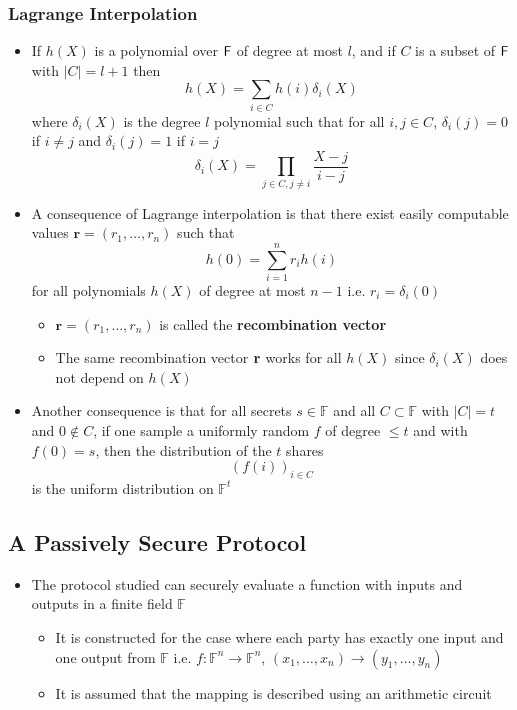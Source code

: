 \subsubsection{Lagrange Interpolation}
\begin{itemize}
  \item If $h(X)$ is a polynomial over $\mathsf{F}$ of degree at most $l$, and if $C$ is a subset of $\mathsf{F}$ with $|C| = l+1$ then
  \[
    h(X) = \sum_{i \in C} h(i) \delta_i(X)
  \]
  where $\delta_i(X)$ is the degree $l$ polynomial such that for all $i,j \in C$, $\delta_i(j) = 0$ if $i \neq j$ and $\delta_i(j) = 1$ if $i=j$
  \[
    \delta_i(X) = \prod_{j \in C, j \neq i} \frac{X-j}{i-j}
  \]	
	
  \item A consequence of Lagrange interpolation is that there exist easily computable values $\mathbf r = (r_1, \dots, r_n)$ such that 
  \[
    h(0) = \sum_{i=1}^n r_i h(i)
  \]
  for all polynomials $h(X)$ of degree at most $n-1$ i.e. $r_i = \delta_i(0)$
  \begin{itemize}
  	\item $\mathbf r = (r_1, \dots, r_n)$ is called the \textbf{recombination vector} 
  	\item The same recombination vector $\bf r$ works for all $h(X)$ since $\delta_i(X)$ does not depend on $h(X)$
  \end{itemize}
  \item Another consequence is that for all secrets $s \in \mathbb F$ and all $C \subset \mathbb F$ with $|C| = t$ and $0 \notin C$, if one sample a uniformly random $f$ of degree $\leq t$ and with $f(0) = s$, then the distribution of the $t$ shares 
  \[
    (f(i))_{i \in C}
  \]
  is the uniform distribution on $\mathbb F^t$	
\end{itemize}

\subsection{A Passively Secure Protocol}
\begin{itemize}
	\item The protocol studied can securely evaluate a function with inputs and outputs in a finite field $\mathbb F$
  \begin{itemize}
  	\item It is constructed for the case where each party has exactly one input and one output from $\mathbb F$ i.e. $f: \mathbb F^n \to \mathbb F^n$, $(x_1, \dots, x_n) \to (y_1, \dots, y_n)$
  	\item It is assumed that the mapping is described using an arithmetic circuit
  \end{itemize}
\end{itemize}

